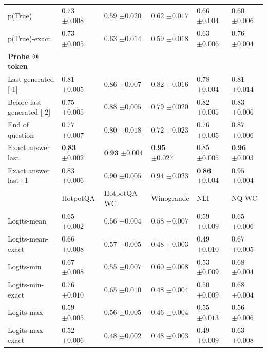 \begin{table}[t]
{\begin{tabular}{l|lllll}
p(True) & $0.73$ \tiny$\pm 0.008$ & $0.59$ \tiny$\pm 0.020$ & $0.62$ \tiny$\pm 0.017$ & $0.66$ \tiny$\pm 0.004$ & $0.60$ \tiny$\pm 0.006$ \\
p(True)-exact & $0.73$ \tiny$\pm 0.005$ & $0.63$ \tiny$\pm 0.014$ & $0.59$ \tiny$\pm 0.018$ & $0.63$ \tiny$\pm 0.006$ & $0.76$ \tiny$\pm 0.004$ \\
\midrule
\textbf{Probe @ token} \\
     \midrule
Last generated [-1] & $0.81$ \tiny$\pm 0.005$ & $0.86$ \tiny$\pm 0.007$ & $0.82$ \tiny$\pm 0.016$ & $0.78$ \tiny$\pm 0.004$ & $0.81$ \tiny$\pm 0.014$ \\
Before last generated [-2] & $0.75$ \tiny$\pm 0.005$ & $0.88$ \tiny$\pm 0.005$ & $0.79$ \tiny$\pm 0.020$ & $0.82$ \tiny$\pm 0.005$ & $0.83$ \tiny$\pm 0.006$ \\
End of question & $0.77$ \tiny$\pm 0.007$ & $0.80$ \tiny$\pm 0.018$ & $0.72$ \tiny$\pm 0.023$ & $0.76$ \tiny$\pm 0.005$ & $0.87$ \tiny$\pm 0.006$ \\
\midrule
Exact answer last & $\textbf{0.83}$ \tiny$\pm 0.002$ & $\textbf{0.93}$ \tiny$\pm 0.004$ & $\textbf{0.95}$ \tiny$\pm 0.027$ & $0.85$ \tiny$\pm 0.005$ & $\textbf{0.96}$ \tiny$\pm 0.003$ \\
Exact answer last+1 & $0.83$ \tiny$\pm 0.006$ & $0.90$ \tiny$\pm 0.005$ & $0.94$ \tiny$\pm 0.023$ & $\textbf{0.86}$ \tiny$\pm 0.004$ & $0.95$ \tiny$\pm 0.004$ \\
     \midrule
    & HotpotQA & HotpotQA-WC & Winogrande & NLI & NQ-WC \\
    \midrule
    Logits-mean & $0.65$ \tiny$\pm 0.002$ & $0.56$ \tiny$\pm 0.004$ & $0.58$ \tiny$\pm 0.007$ & $0.59$ \tiny$\pm 0.009$ & $0.65$ \tiny$\pm 0.006$ \\
Logits-mean-exact & $0.66$ \tiny$\pm 0.008$ & $0.57$ \tiny$\pm 0.005$ & $0.48$ \tiny$\pm 0.003$ & $0.49$ \tiny$\pm 0.010$ & $0.67$ \tiny$\pm 0.005$ \\
Logits-min & $0.67$ \tiny$\pm 0.008$ & $0.55$ \tiny$\pm 0.007$ & $0.60$ \tiny$\pm 0.008$ & $0.53$ \tiny$\pm 0.009$ & $0.68$ \tiny$\pm 0.004$ \\
Logits-min-exact & $0.76$ \tiny$\pm 0.010$ & $0.65$ \tiny$\pm 0.010$ & $0.48$ \tiny$\pm 0.004$ & $0.50$ \tiny$\pm 0.009$ & $0.68$ \tiny$\pm 0.004$ \\
Logits-max & $0.59$ \tiny$\pm 0.005$ & $0.56$ \tiny$\pm 0.005$ & $0.46$ \tiny$\pm 0.004$ & $0.55$ \tiny$\pm 0.013$ & $0.56$ \tiny$\pm 0.006$ \\
Logits-max-exact & $0.52$ \tiny$\pm 0.006$ & $0.48$ \tiny$\pm 0.002$ & $0.48$ \tiny$\pm 0.003$ & $0.49$ \tiny$\pm 0.009$ & $0.63$ \tiny$\pm 0.008$ \\

\end{tabular}}
\end{table}
